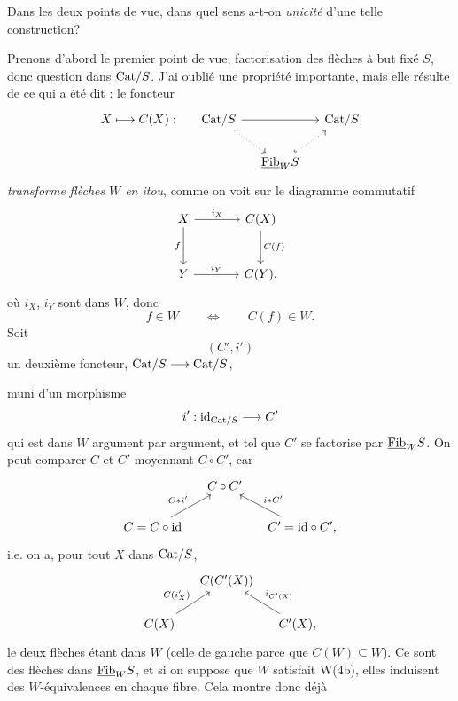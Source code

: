 Dans les deux points de vue, dans quel sens a-t-on \textit{unicité} d'une telle construction?

Prenons d'abord le premier point de vue, factorisation des flèches à but fixé $S$, donc question dans $\mathrm{Cat}/S$. J'ai oublié une propriété importante, mais elle résulte de ce qui a été dit : le foncteur
\[
\begin{tikzcd}[column sep=small]
X \longmapsto C(X) : & \Cat/S \arrow[rr] \arrow[dr, dotted] & & \Cat/S \\
& & \Fib_W S \arrow[ur, dotted, hook] &
\end{tikzcd}
\]
\textit{transforme} \textit{flèches} \textit{$W$ en itou}, comme on voit sur le diagramme commutatif
\[
\begin{tikzcd}[row sep=large, column sep=large]
X \arrow[r, "i_X"] \arrow[d, "f"'] & C(X) \arrow[d, "C(f)"] \\
Y \arrow[r, "i_Y"] & C(Y),
\end{tikzcd}
\]
où $i_X$, $i_Y$ sont dans $W$, donc
\[
f \in W \qquad \Longleftrightarrow \qquad C(f) \in W.
\]
Soit
\[
(C',i')
\]
un deuxième foncteur, $\mathrm{Cat}/S \longrightarrow \mathrm{Cat}/S$,

muni d'un morphisme
\[
i' : \mathrm{id}_{\mathrm{Cat}/S} \longrightarrow C'
\]
qui est dans $W$ argument par argument, et tel que $C'$ se factorise par $\underline{\mathrm{Fib}}_W S$. On peut comparer $C$ et $C'$ moyennant $C \circ C'$, car
\[
\begin{tikzcd}[column sep=small]
& C \circ C' & \\
C = C \circ \mathrm{id} \arrow[ur, "C\ast i'"] & & C' = \mathrm{id} \circ C', \arrow[ul, "i\ast C'"']
\end{tikzcd}
\]
i.e. on a, pour tout $X$ dans $\mathrm{Cat}/S$,
\[
\begin{tikzcd}[column sep=small]
& C(C'(X)) & \\
C(X) \arrow[ur, "C(i'_X)"] & & C'(X), \arrow[ul, "i_{C'(X)}"']
\end{tikzcd}
\]
le deux flèches étant dans $W$ (celle de gauche parce que $C(W) \subseteq W$). Ce sont des flèches dans $\underline{\mathrm{Fib}}_W S$, et si on suppose que $W$ satisfait W(4b), elles induisent des $W$-équivalences en chaque fibre. Cela montre donc déjà %

